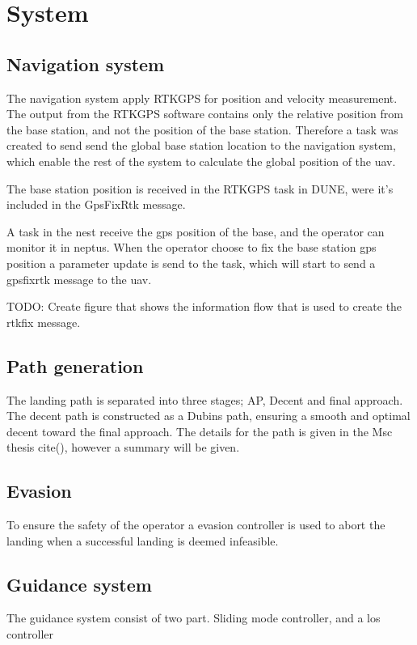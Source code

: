 \chapter{System}

\section{Navigation system}
The navigation system apply RTKGPS for position and velocity measurement. The output from the RTKGPS software contains only the relative position from the base station, and not the position of the base station. Therefore a task was created to send send the global base station location to the navigation system, which enable the rest of the system to calculate the global position of the uav. 

The base station position is received in the RTKGPS task in DUNE, were it's included in the GpsFixRtk message.

A task in the nest receive the gps position of the base, and the operator can monitor it in neptus. When the operator choose to fix the base station gps position a parameter update is send to the task, which will start to send a gpsfixrtk message to the uav. 

TODO: Create figure that shows the information flow that is used to create the rtkfix message.

\section{Path generation}
The landing path is separated into three stages; AP, Decent and final approach. The decent path is constructed as a Dubins path, ensuring a smooth and optimal decent toward the final approach. The details for the path is given in the Msc thesis cite(), however a summary will be given.

\section{Evasion}
To ensure the safety of the operator a evasion controller is used to abort the landing when a successful landing is deemed infeasible.

\section{Guidance system}
The guidance system consist of two part. Sliding mode controller, and a los controller